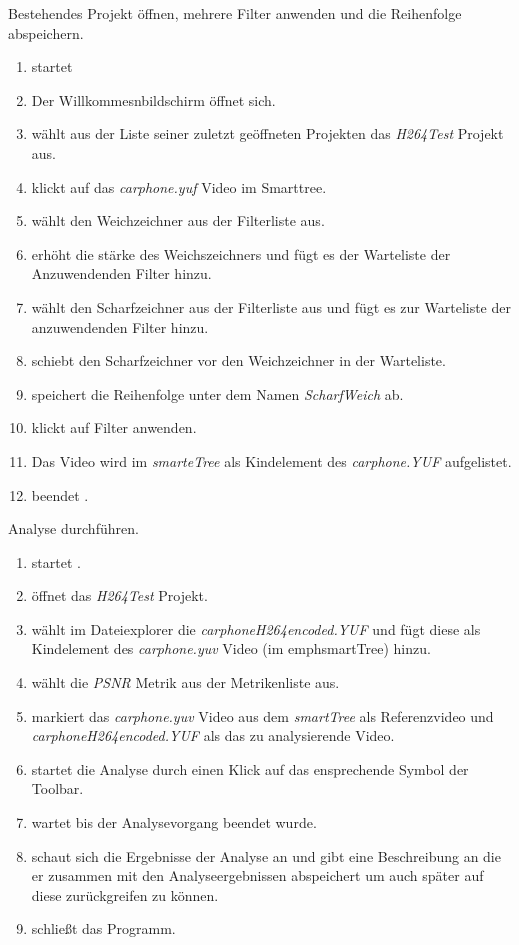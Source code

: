  Bestehendes Projekt öffnen, mehrere Filter anwenden und die Reihenfolge abspeichern.\\ %
\begin{enumerate}
\item \dAU startet \projektTitel
\item Der Willkommesnbildschirm öffnet sich.
\item \dAU wählt aus der Liste seiner zuletzt geöffneten Projekten das \emph{H264Test} Projekt aus.
\item \dAU klickt auf das \emph{carphone.yuf} Video im Smarttree.
\item \dAU wählt den Weichzeichner aus der Filterliste aus.
\item \dAU erhöht die stärke des Weichszeichners und fügt es der Warteliste der Anzuwendenden Filter hinzu.
\item \dAU wählt den Scharfzeichner aus der Filterliste aus und fügt es zur Warteliste der anzuwendenden Filter hinzu. 
\item \dAU schiebt den Scharfzeichner vor den Weichzeichner in der Warteliste.
\item \dAU speichert die Reihenfolge unter dem Namen \emph{ScharfWeich} ab.
\item \dAU klickt auf Filter anwenden.
\item Das Video wird im \emph{smarteTree} als Kindelement des \emph{carphone.YUF} aufgelistet.
\item  \dAU beendet \projektTitel.
\end{enumerate}

 Analyse durchführen.
\begin{enumerate}
\item \dAU startet \projektTitel.
\item öffnet das \emph{H264Test} Projekt.
\item \dAU wählt im Dateiexplorer die \emph{carphoneH264encoded.YUF} und fügt diese als Kindelement des \emph{carphone.yuv} Video (im emph{smartTree}) hinzu.
\item \dAU wählt die \emph{PSNR} Metrik aus der Metrikenliste aus.
\item \dAU markiert das \emph{carphone.yuv} Video aus dem \emph{smartTree} als Referenzvideo und \emph{carphoneH264encoded.YUF} als das zu analysierende Video.
\item \dAU startet die Analyse durch einen Klick auf das ensprechende Symbol der Toolbar.
\item \dAU wartet bis der Analysevorgang beendet wurde.
\item \dAU schaut sich die Ergebnisse der Analyse an und gibt eine Beschreibung an die er zusammen mit den Analyseergebnissen abspeichert um auch später auf diese zurückgreifen zu können.
\item \dAU schließt das Programm.
\end{enumerate}


